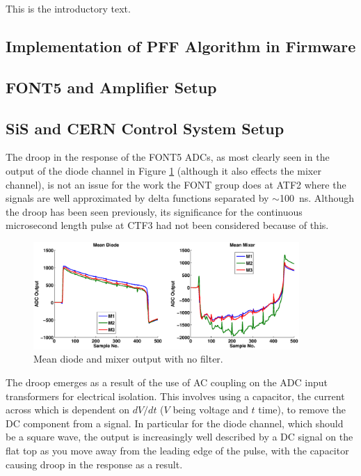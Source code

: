 
This is the introductory text.


\subsection{Implementation of PFF Algorithm in Firmware}
\label{ss:pffFirmware}

\subsection{FONT5 and Amplifier Setup}
\label{ss:fontSetup}

\subsection{SiS and CERN Control System Setup}
\label{ss:sisSetup}


The droop in the response of the FONT5 ADCs, as most clearly seen in the output of the diode channel in Figure \ref{f:diodeDroop} (although it also effects the mixer channel), is not an issue for the work the FONT group does at ATF2 where the signals are well approximated by delta functions separated by \(\sim\)100~ns. Although the droop has been seen previously, its significance for the continuous microsecond length pulse at CTF3 had not been considered because of this.

\begin{figure}
  \centering
  \includegraphics[width=0.9\textwidth]{Figures/diodeDroop}
  \caption{Mean diode and mixer output with no filter.}
  \label{f:diodeDroop}
\end{figure}

The droop emerges as a result of the use of AC coupling on the ADC input transformers for electrical isolation. This involves using a capacitor, the current across which is dependent on \({dV}/{dt}\) (\(V\) being voltage and \(t\) time), to remove the DC component from a signal. In particular for the diode channel, which should be a square wave, the output is increasingly well described by a DC signal on the flat top as you move away from the leading edge of the pulse, with the capacitor causing droop in the response as a result.

